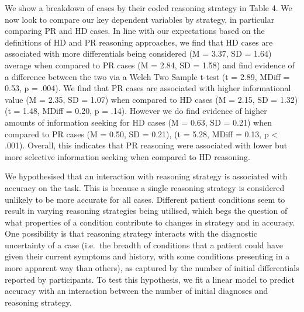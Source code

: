 \documentclass[a4paper, nobind]{templates/ociamthesis}
\begin{document}
We show a breakdown of cases by their coded reasoning strategy in Table 4. We now look to compare our key dependent variables by strategy, in particular comparing PR and HD cases. In line with our expectations based on the definitions of HD and PR reasoning approaches, we find that HD cases are associated with more differentials being considered (M = 3.37, SD = 1.64) average when compared to PR cases (M = 2.84, SD = 1.58) and find evidence of a difference between the two via a Welch Two Sample t-test (t = 2.89, MDiff = 0.53, p = .004). We find that PR cases are associated with higher informational value (M = 2.35, SD = 1.07) when compared to HD cases (M = 2.15, SD = 1.32) (t = 1.48, MDiff = 0.20, p = .14). However we do find evidence of higher amounts of information seeking for HD cases (M = 0.63, SD = 0.21) when compared to PR cases (M = 0.50, SD = 0.21), (t = 5.28, MDiff = 0.13, p \textless{} .001). Overall, this indicates that PR reasoning were associated with lower but more selective information seeking when compared to HD reasoning.

We hypothesised that an interaction with reasoning strategy is associated with accuracy on the task. This is because a single reasoning strategy is considered unlikely to be more accurate for all cases. Different patient conditions seem to result in varying reasoning strategies being utilised, which begs the question of what properties of a condition contribute to changes in strategy and in accuracy. One possibility is that reasoning strategy interacts with the diagnostic uncertainty of a case (i.e.~the breadth of conditions that a patient could have given their current symptoms and history, with some conditions presenting in a more apparent way than others), as captured by the number of initial differentials reported by participants. To test this hypothesis, we fit a linear model to predict accuracy with an interaction between the number of initial diagnoses and reasoning strategy.
\end{document}

